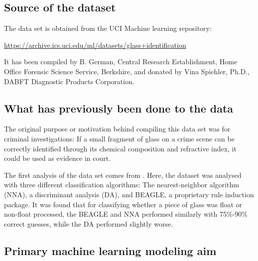 \subsection{Source of the dataset}

The data set is obtained from the UCI Machine learning repository:

\url{https://archive.ics.uci.edu/ml/datasets/glass+identification}

It has been compiled by B. German, Central Research Establishment, Home Office Forensic Science Service, Berkshire, and donated by Vina Spiehler, Ph.D., DABFT Diagnostic Products Corporation.

\subsection{What has previously been done to the data}

The original purpose or motivation behind compiling this data set was for criminal investigations: If a small fragment of glass on a crime scene can be correctly identified through its chemical composition and refractive index, it could be used as evidence in court.

The first analysis of the data set comes from  \cite{evett1987induction}. Here, the dataset was analysed with three different classification algorithms: The nearest-neighbor algorithm (NNA), a discriminant analysis (DA), and BEAGLE, a proprietary rule induction package. It was found that for classifying whether a piece of glass was float or non-float processed, the BEAGLE and NNA performed similarly with 75\%-90\% correct guesses, while the DA performed slightly worse.

\subsection{Primary machine learning modeling aim}



